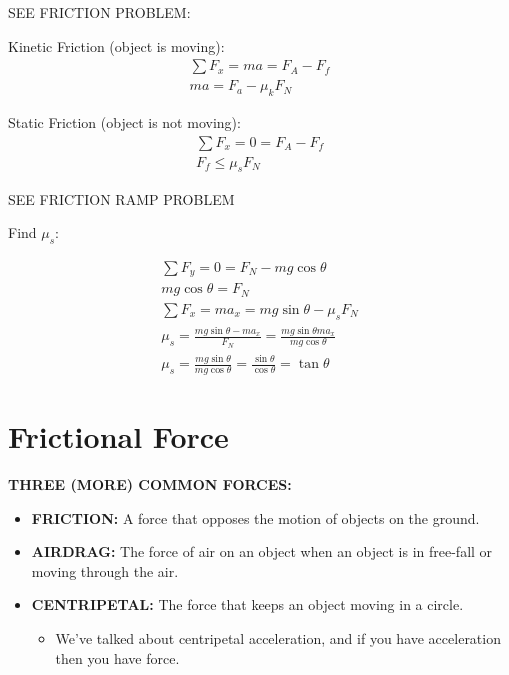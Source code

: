 \begin{problem}
	SEE FRICTION PROBLEM:

	Kinetic Friction (object is moving):
	$$
		\begin{aligned}
			\sum F_x = ma = F_A - F_f\\
			ma = F_a - \mu_kF_N
		\end{aligned}
	$$

	Static Friction (object is not moving):
	$$
		\begin{aligned}
			\sum F_x = 0 = F_A - F_f\\
			F_f \le \mu_s F_N
		\end{aligned}
	$$
\end{problem}

\begin{problem}
	SEE FRICTION RAMP PROBLEM

	Find $\mu_s$:

	$$
		\begin{aligned}
			\sum F_y = 0 = F_N - mg\cos\theta\\
			mg\cos\theta = F_N\\
			\sum F_x = ma_x = mg\sin\theta - \mu_sF_N\\
			\mu_s = \frac{mg\sin\theta - ma_x}{F_N} = \frac{mg\sin\theta ma_x}{mg\cos\theta}\\
			\mu_s = \frac{mg\sin\theta}{mg\cos\theta} = \frac{\sin\theta}{\cos\theta}=\tan\theta
		\end{aligned}
	$$
\end{problem}


\section{Frictional Force}

\textbf{THREE (MORE) COMMON FORCES:}
\begin{itemize}
	\item \textbf{FRICTION:} A force that opposes the motion of objects on the ground.
	\item \textbf{AIRDRAG:} The force of air on an object when an object is in free-fall or moving through the air.
	\item \textbf{CENTRIPETAL:} The force that keeps an object moving in a circle.
	\begin{itemize}
		\item We've talked about centripetal acceleration, and if you have acceleration then you have force.
	\end{itemize}
\end{itemize}
	
